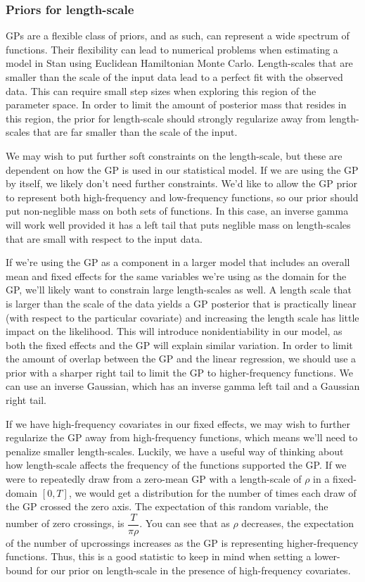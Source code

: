 \subsubsection{Priors for length-scale}

GPs are a flexible class of priors, and as such, can represent a wide spectrum
of functions. Their flexibility can lead to numerical problems when estimating 
a model in Stan using Euclidean Hamiltonian Monte Carlo. Length-scales that are
smaller than the scale of the input data lead to a perfect fit with the
observed data. This can require small step sizes when exploring this region
of the parameter space. In order to limit the amount of posterior mass that
resides in this region, the prior for length-scale should strongly regularize
away from length-scales that are far smaller than the scale of the input.

We may wish to put further soft constraints on the length-scale, but these are
dependent on how the GP is used in our statistical model. If we are using the
GP by itself, we likely don't need further constraints. We'd like to allow the
GP prior to represent both high-frequency and low-frequency functions, so our
prior should put non-neglible mass on both sets of functions. In this case, an
inverse gamma will work well provided it has a left tail that puts neglible
mass on length-scales that are small with respect to the input data.  

If we're using the GP as a component in a larger model that includes an overall
mean and fixed effects for the same variables we're using as the domain for the
GP, we'll likely want to constrain large length-scales as well. A length scale
that is larger than the scale of the data yields a GP posterior that is
practically linear (with respect to the particular covariate) and increasing
the length scale has little impact on the likelihood. This will introduce
nonidentiability in our model, as both the fixed effects and the GP will
explain similar variation. In order to limit the amount of overlap between the
GP and the linear regression, we should use a prior with a sharper right tail
to limit the GP to higher-frequency functions. We can use an inverse Gaussian,
which has an inverse gamma left tail and a Gaussian right tail.

If we have high-frequency covariates in our fixed effects, we may wish to further
regularize the GP away from high-frequency functions, which means we'll need to 
penalize smaller length-scales. Luckily, we have a useful way of thinking about
how length-scale affects the frequency of the functions supported the GP. If we
were to repeatedly draw from a zero-mean GP with a length-scale of $\rho$ in a
fixed-domain $[0,T]$, we would get a distribution for the number of times each draw
of the GP crossed the zero axis. The expectation of this random variable, the number
of zero crossings, is $\dfrac{T}{\pi \rho}$. You can see that as $\rho$ decreases,
the expectation of the number of upcrossings increases as the GP is representing 
higher-frequency functions. Thus, this is a good statistic to keep in mind when
setting a lower-bound for our prior on length-scale in the presence of high-frequency
covariates. 

